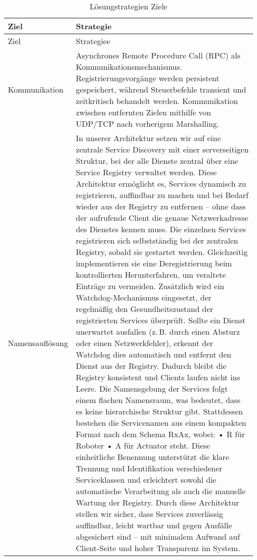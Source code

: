 \begin{longtable}{|>{\raggedright\arraybackslash}p{4cm}|>{\raggedright\arraybackslash}p{10cm}|}
	\caption{Lösungstrategien Ziele} \label{tab:loesungsstrategieZiele} \\
	\hline
	Ziel & Strategie \\
	\hline
	\endfirsthead
	
	\hline
	Ziel & Strategiee\\
	\hline
	\endhead
	
	\hline
	\endfoot
	
	Kommunikation &
	Asynchrones Remote Procedure Call (RPC) als Kommunikationsmechanismus. Registrierungsvorgänge werden persistent gespeichert, während Steuerbefehle transient und zeitkritisch behandelt werden. Kommunikation zwischen entfernten Zielen mithilfe von UDP/TCP nach vorherigem Marshalling.
	\\
	\hline
	Namensauflösung
	& In unserer Architektur setzen wir auf eine zentrale Service Discovery mit einer serverseitigen Struktur, bei der alle Dienste zentral über eine Service Registry verwaltet werden. Diese Architektur ermöglicht es, Services dynamisch zu registrieren, auffindbar zu machen und bei Bedarf wieder aus der Registry zu entfernen – ohne dass der aufrufende Client die genaue Netzwerkadresse des Dienstes kennen muss.
	Die einzelnen Services registrieren sich selbstständig bei der zentralen Registry, sobald sie gestartet werden. Gleichzeitig implementieren sie eine Deregistrierung beim kontrollierten Herunterfahren, um veraltete Einträge zu vermeiden. Zusätzlich wird ein Watchdog-Mechanismus eingesetzt, der regelmäßig den Gesundheitszustand der registrierten Services überprüft. Sollte ein Dienst unerwartet ausfallen (z. B. durch einen Absturz oder einen Netzwerkfehler), erkennt der Watchdog dies automatisch und entfernt den Dienst aus der Registry. Dadurch bleibt die Registry konsistent und Clients laufen nicht ins Leere.
	Die Namensgebung der Services folgt einem flachen Namensraum, was bedeutet, dass es keine hierarchische Struktur gibt. Stattdessen bestehen die Servicenamen aus einem kompakten Format nach dem Schema RxAx, wobei:
	•	R für Roboter
	•	A für Actuator
	steht. Diese einheitliche Benennung unterstützt die klare Trennung und Identifikation verschiedener Serviceklassen und erleichtert sowohl die automatische Verarbeitung als auch die manuelle Wartung der Registry.
	Durch diese Architektur stellen wir sicher, dass Services zuverlässig auffindbar, leicht wartbar und gegen Ausfälle abgesichert sind – mit minimalem Aufwand auf Client-Seite und hoher Transparenz im System.

\end{longtable}

